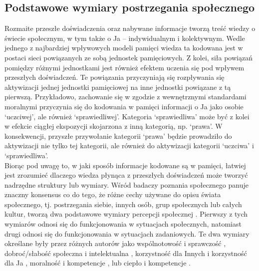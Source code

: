 \documentclass[man]{apa6}
\begin{document}
\newpage
\subsection{Podstawowe wymiary postrzegania społecznego}

Rozmaite przeszłe doświadczenia oraz nabywane informacje tworzą treść wiedzy o świecie społecznym, w tym także o Ja -- indywidualnym i kolektywnym. Wedle jednego z najbardziej wpływowych modeli pamięci \parencite{anderson1983spreading} wiedza ta kodowana jest w postaci sieci powiązanych ze sobą jednostek pamięciowych. Z kolei, siła powiązań pomiędzy różnymi jednostkami jest również efektem uczenia się pod wpływem przeszłych doświadczeń. Te powiązania przyczyniają się rozpływania się aktywizacji jednej jednostki pamięciowej na inne jednostki powiązane z tą pierwszą. Przykładowo, zachowanie się w zgodzie z wewnętrznymi standardami moralnymi przyczynia się do kodowania w pamięci informacji o Ja jako osobie `uczciwej', ale również `sprawiedliwej'. Kategoria `sprawiedliwa' może być z kolei w efekcie ciągłej ekspozycji skojarzona z inną kategorią, np. `prawa'. W konsekwencji, przyszłe przywołanie kategorii `prawa' będzie prowadziło do aktywizacji nie tylko tej kategorii, ale również do aktywizacji kategorii `uczciwa' i `sprawiedliwa'.\\

Biorąc pod uwagę to, w jaki sposób informacje kodowane są w pamięci, łatwiej jest zrozumieć dlaczego wiedza płynąca z przeszłych doświadczeń może tworzyć nadrzędne struktury lub wymiary. Wśród badaczy poznania społecznego panuje znaczny konsensus co do tego, że różne cechy używane do opisu świata społecznego, tj. postrzegania siebie, innych osób, grup społecznych lub całych kultur, tworzą dwa podstawowe wymiary percepcji społecznej \parencite{fiske2007universal, judd2005fundamental}. Pierwszy z tych wymiarów odnosi się do funkcjonowania w sytuacjach społecznych, natomiast drugi odnosi się do funkcjonowania w sytuacjach zadaniowych. Te dwa wymiary określane były przez różnych autorów jako wspólnotowość i sprawczość \parencite{abele2007agency}, dobroć/słabość społeczna i intelektualna \parencite {rosenberg1968multidimensional}, korzystność dla Innych i korzystność dla Ja \parencite{peeters1992evaluative}, moralność i kompetencje \parencite{wojciszke2005morality}, lub ciepło i kompetencje \parencite{fiske2002model}.\\
\end{document}
